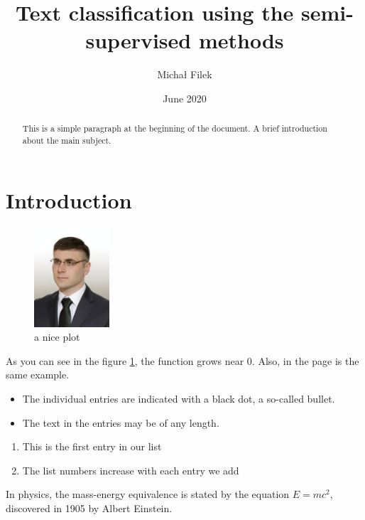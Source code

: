 \documentclass[12pt]{article}
\title{Text classification using the semi-supervised methods}
\author{Michał Filek}
\date{June 2020}
\theoremstyle{definition}
\DeclareRobustCommand{\[}{\begin{equation}}
\DeclareRobustCommand{\]}{\end{equation}}
\begin{document}
\setlength{\parskip}{0.25 \baselineskip}
\newlength{\figwidth}
\setlength{\figwidth}{26pc}
\newlength{\notationgap}
\setlength{\notationgap}{1pc}


\maketitle
\begin{abstract}
This is a simple paragraph at the beginning of the 
document. A brief introduction about the main subject.
\end{abstract}

\tableofcontents

\medskip


\section{Introduction}
\begin{figure}[h]
    \centering
    \includegraphics[width=0.25\textwidth]{photo.jpg}
    \caption{a nice plot}
    \label{fig:photo}
\end{figure}

As you can see in the figure \ref{fig:photo}, the 
function grows near 0. Also, in the page \pageref{fig:photo} 
is the same example.

\begin{itemize}
  \item The individual entries are indicated with a black dot, a so-called bullet.
  \item The text in the entries may be of any length.
\end{itemize}

\begin{enumerate}
  \item This is the first entry in our list
  \item The list numbers increase with each entry we add
\end{enumerate}

In physics, the mass-energy equivalence is stated 
by the equation $E=mc^2$, discovered in 1905 by Albert Einstein.
\end{document}
